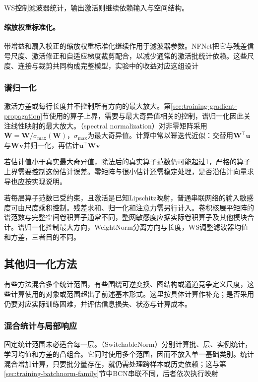 WS控制滤波器统计，输出激活则继续依赖输入与空间结构。

\paragraph{缩放权重标准化。}

带增益和扇入校正的缩放权重标准化继续作用于滤波器参数。NFNet把它与残差信号尺度、激活修正和自适应梯度裁剪配合，以减少通常的激活批统计依赖。这些尺度、连接与裁剪共同构成完整模型，实验中的收益对应这组设计

\subsubsection{谱归一化}
\label{sec:training-spectralnorm}
激活方差或每行长度并不控制所有方向的最大放大。第\ref{sec:training-gradient-propagation}节使用的算子上界，需要与最大奇异值相关的控制，谱归一化因此关注线性映射的最大放大。（spectral normalization）对非零矩阵采用$\bar{\bm W}=\bm W/\sigma_{\max}(\bm W)$，$\sigma_{\max}$为最大奇异值。计算中常以幂迭代近似：交替用$\bm W^{\top}\bm u$与$\bm W\bm v$并归一化，再估计$\bm u^{\top}\bm W\bm v$

若估计值小于真实最大奇异值，除法后的真实算子范数仍可能超过1，严格的算子上界需要控制这份估计误差。零矩阵与很小估计还需稳定处理，是否沿估计向量求导也应按实现说明。

若每层算子范数已受约束，且激活是已知Lipschitz映射，普通串联网络的输入敏感度可由尺度乘积控制。残差求和、归一化和注意力需另行计入。卷积核展平矩阵的谱范数与完整空间卷积算子通常不同，整网敏感度应据实际卷积算子及其他模块合计。谱归一化控制最大方向，WeightNorm分离方向与长度，WS调整滤波器均值和方差，三者目的不同。

\subsection{其他归一化方法}
\label{sec:training-other-normalization}
有些方法混合多个统计范围，有些围绕可逆变换、图结构或通道竞争定义尺度，这些计算使用的对象或范围超出了前述基本形式。这里按具体计算作补充；是否采用仍要对应实际训练困难，并评估信息损失、状态与计算成本。

\subsubsection{混合统计与局部响应}
\label{sec:training-normalization-combinations}
\label{sec:training-switchable-bcn}
固定统计范围未必适合每一层。（SwitchableNorm）分别计算批、层、实例统计，学习均值和方差的凸组合。它同时使用多个范围，因而不放入单一基础类别。统计混合增加计算，只要批分量存在，就仍需处理跨样本或历史依赖；这与第\ref{sec:training-batchnorm-family}节中BCN串联不同，后者依次执行映射

